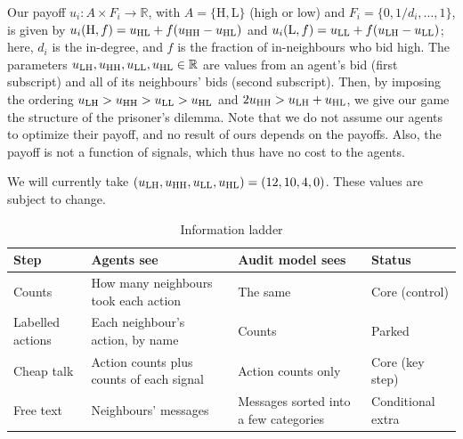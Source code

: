 Our payoff $u_i \colon A \times F_i \to \mathbb{R}$, with $A = \{\mathrm{H}, \mathrm{L}\}$ (high or low) and $F_i = \{0, 1/d_i, \ldots, 1\}$, is given by $u_i(\mathrm{H}, f) = u_{\mathrm{HL}} + f(u_{\mathrm{HH}} - u_{\mathrm{HL}})$ and $u_i(\mathrm{L}, f) = u_{\mathrm{LL}} + f(u_{\mathrm{LH}} - u_{\mathrm{LL}})$; here, $d_i$ is the in-degree, and $f$ is the fraction of in-neighbours who bid high.
The parameters $u_{\mathrm{LH}}, u_{\mathrm{HH}}, u_{\mathrm{LL}}, u_{\mathrm{HL}} \in \mathbb{R}$ are values from an agent's bid (first subscript) and all of its neighbours' bids (second subscript).
Then, by imposing the ordering $u_{\mathrm{LH}} > u_{\mathrm{HH}} > u_{\mathrm{LL}} > u_{\mathrm{HL}}$ and $2u_{\mathrm{HH}} > u_{\mathrm{LH}} + u_{\mathrm{HL}}$, we give our game the structure of the prisoner's dilemma.
Note that we do not assume our agents to optimize their payoff, and no result of ours depends on the payoffs.
Also, the payoff is not a function of signals, which thus have no cost to the agents.

We will currently take $(u_{\mathrm{LH}}, u_{\mathrm{HH}}, u_{\mathrm{LL}}, u_{\mathrm{HL}}) = (12, 10, 4, 0)$.
These values are subject to change.

\begin{table}[ht]
  \centering\small
  \begin{tabular}{@{}l p{} p{} l@{}}
    \toprule
    Step & Agents see & Audit model sees & Status \\
    \midrule
    Counts & How many neighbours took each action & The same & Core (control) \\
    Labelled actions & Each neighbour's action, by name & Counts & Parked \\
    Cheap talk & Action counts plus counts of each signal & Action counts only & Core (key step) \\
    Free text & Neighbours' messages & Messages sorted into a few categories & Conditional extra \\
    \bottomrule
  \end{tabular}
  \caption{Information ladder}
  \label{tab:ladder}
\end{table}

